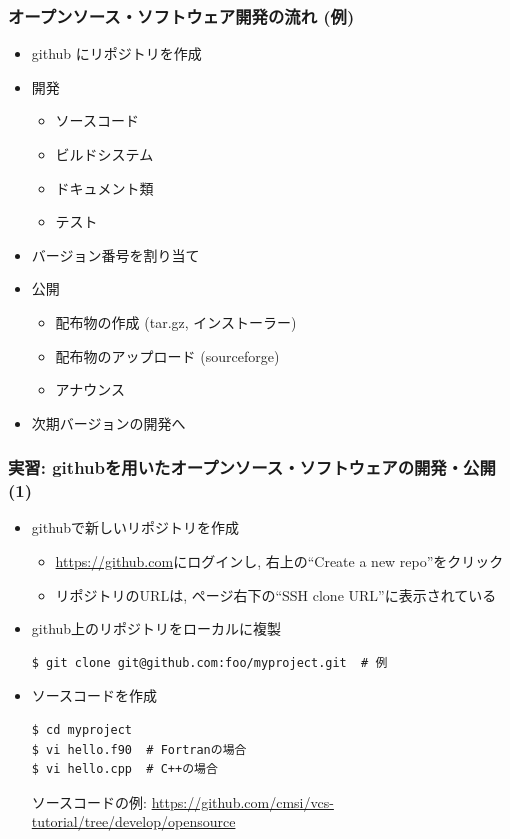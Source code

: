 \begin{frame}
  \frametitle{オープンソース・ソフトウェア開発の流れ (例)}
  \begin{itemize}
  \item github にリポジトリを作成
  \item 開発
    \begin{itemize}
    \item ソースコード
    \item ビルドシステム
    \item ドキュメント類
    \item テスト
    \end{itemize}
  \item バージョン番号を割り当て
  \item 公開
    \begin{itemize}
    \item 配布物の作成 (tar.gz, インストーラー)
    \item 配布物のアップロード (sourceforge)
    \item アナウンス
    \end{itemize}
  \item 次期バージョンの開発へ
  \end{itemize}
\end{frame}

\begin{frame}[t,fragile]
  \frametitle{実習: githubを用いたオープンソース・ソフトウェアの開発・公開(1)}
  \begin{itemize}
  \item githubで新しいリポジトリを作成
    \begin{itemize}
      \item \url{https://github.com}にログインし, 右上の``Create a new repo''をクリック
      \item リポジトリのURLは, ページ右下の``SSH clone URL''に表示されている
    \end{itemize}
  \item github上のリポジトリをローカルに複製
\begin{lstlisting}
$ git clone git@github.com:foo/myproject.git  # 例
\end{lstlisting}
  \item ソースコードを作成
\begin{lstlisting}
$ cd myproject
$ vi hello.f90  # Fortranの場合
$ vi hello.cpp  # C++の場合
\end{lstlisting}
  ソースコードの例: \url{https://github.com/cmsi/vcs-tutorial/tree/develop/opensource}
  \end{itemize}
\end{frame}

